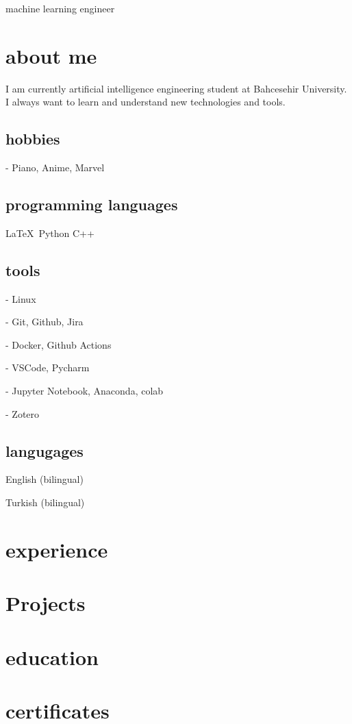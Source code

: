 \documentclass{resume-class} %
\begin{document}
machine learning engineer
\drawsidebar
\section{about me}

I am currently artificial intelligence engineering student at Bahcesehir University. I always want to learn and understand new technologies and tools.

\subsection{hobbies}

- Piano, Anime, Marvel


\subsection{programming languages}

\LaTeX\ Python C++

\subsection{tools}
- Linux

- Git, Github, Jira

- Docker, Github Actions

- VSCode, Pycharm

- Jupyter Notebook, Anaconda, colab

- Zotero


\subsection{langugages}

English (bilingual)

Turkish (bilingual)


\section{experience}
\blindtext

\section{Projects}
\blindtext

\section{education}
\blindtext

\section{certificates}
\blindtext
\end{document}
